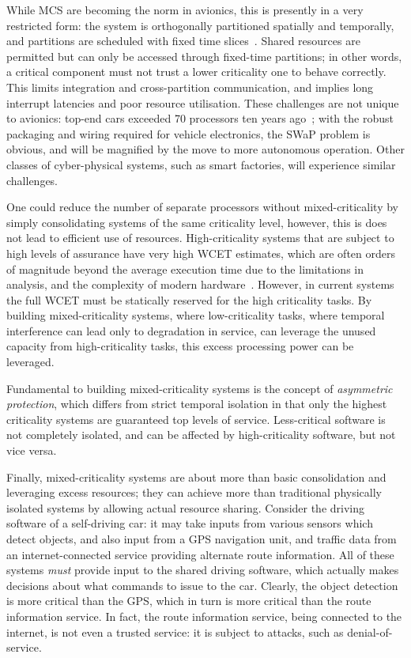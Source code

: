 While MCS are becoming the norm in avionics, this is presently in a very restricted form: the system
is orthogonally partitioned spatially and temporally, and partitions are scheduled with fixed time
slices~\citep{ARINC653}. Shared resources are permitted but can only be accessed through fixed-time
partitions; in other words, a critical component must not
trust a lower criticality one to behave correctly. This limits integration and cross-partition
communication, and implies long interrupt latencies and poor resource utilisation. 
These challenges are not unique to avionics: top-end cars exceeded 70 processors ten years
ago~\citep{Broy_KPS_07}; with the robust packaging and wiring required for vehicle electronics, the
SWaP problem is obvious, and will be magnified by the move to more autonomous operation. Other
classes of cyber-physical systems, such as smart factories, will experience similar challenges.

One could reduce the number of separate processors without mixed-criticality by simply consolidating 
systems of the same criticality level, however, this is does not lead to efficient use of resources. 
High-criticality systems that are subject to high levels of assurance have very high \gls{WCET} estimates,
which are often orders of magnitude beyond the average execution time due to the limitations in analysis,
and the complexity of modern hardware~\citep{Wilhelm_EEHTWBFHMMPPSS_08}. However, in current systems the full \gls{WCET} must be
statically reserved for the high criticality tasks. By building mixed-criticality systems, where
low-criticality tasks, where temporal interference can lead only to degradation in service,  can
leverage the unused capacity from high-criticality tasks, this excess
processing power can be leveraged. 

Fundamental to building mixed-criticality systems is the concept of \emph{asymmetric protection},
which differs from strict temporal isolation in that only the highest criticality systems are
guaranteed top levels of service. Less-critical software is not completely isolated, and can be
affected by high-criticality software, but not vice versa. 

Finally, mixed-criticality systems are about more than basic consolidation and leveraging excess
resources; they can achieve more
than traditional physically isolated systems by allowing actual resource sharing. 
Consider the driving software of a self-driving car: it may take inputs from various sensors
which detect objects, and also input from a \gls{GPS} navigation unit, and traffic data from an
internet-connected
service providing alternate route information. All of these systems \emph{must} provide input to the
shared driving software, which actually makes decisions about what commands to issue to the car.
Clearly, the object detection is more critical than the \gls{GPS}, which in turn is more critical than the
route information service. In fact, the route information service, being connected to the internet,
is not even a trusted service: it is subject to attacks, such as denial-of-service. 

